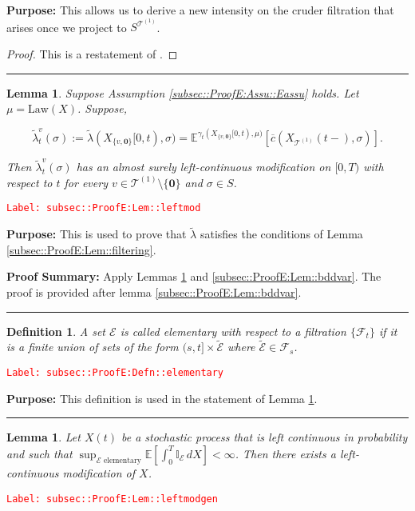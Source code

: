 \documentclass[12pt]{article}
\newcommand{\mb}{\mathbb}
\newcommand{\mc}{\mathcal}
\newcommand{\ov}{\overline}
\newcommand{\te}{\text}
\newcommand{\tr}{\textcolor{red}}
\newcommand{\labe}[1]{\tr{\texttt{Label: #1}}}
\newcommand{\purpose}{\textbf{Purpose: }}
\newcommand{\pfsum}{\textbf{Proof Summary: }}
\newcommand{\lin}{\rule{\linewidth}{0.4 pt}}
\newcommand{\ex}[1]{\mb{E}\left[#1\right]}			%
\newcommand{\exmu}[2]{\mb{E}^{#1}\left[#2\right]}	%
\renewcommand{\root}{\mathbf{0}}				%
\renewcommand{\v}{v}							%
\renewcommand{\S}{S}							%
\newcommand{\s}{\sigma}							%
\newcommand{\T}{T}								%
\renewcommand{\t}{t}							%
\renewcommand{\tt}{s}							%
\newcommand{\F}{\mc{F}}							%
\newcommand{\X}{X}								%
\newcommand{\vind}[1]{^{#1}}					%
\newcommand{\carp}[1]{^{#1}}					%
\newcommand{\cind}[1]{_{#1}}					%
\newcommand{\tp}[1]{(#1)}						%
\newcommand{\tip}[1]{#1}						%
\newcommand{\ts}[1]{_{#1}}						%
\newcommand{\IGrg}{\ov{c}}						%
\newcommand{\tree}{\mc{T}}						%
\newcommand{\sln}[1]{^{(#1)}}					%
\newcommand{\alt}[1]{\widetilde{#1}}			%
\newcommand{\m}{\mu}							%
\newcommand{\cm}{\gamma}						%
\newcommand{\law}{\te{Law}}						%
\newcommand{\evnt}{\mc{E}}						%
\newcommand{\crate}{\alt{\lambda}}				%
\newtheorem{lem}[thms]{Lemma}
\newtheorem{defn}[thms]{Definition}
\begin{document}
\purpose This allows us to derive a new intensity on the cruder filtration that arises once we project to \(\S\carp{\tree\sln{1}}\).

\begin{proof}
This is a restatement of \cite[Theorem 14.3.III]{DalVer08}.
\end{proof}

\lin

\begin{lem}
Suppose Assumption \ref{subsec::ProofE:Assu::Eassu} holds. Let \(\m = \law(\X)\). Suppose,

\[\crate\vind{\v}\ts{\t}(\s) := \crate(\X\cind{\{\v,\root\}}\tip{[0,\t)},\s) = \exmu{\cm\ts{\t}(\X\cind{\{\v,\root\}}\tip{[0,\t)},\m)}{\IGrg(\X\cind{\tree\sln{1}}\tp{\t-},\s)}.\]


Then \(\crate\vind{\v}\ts{\t}(\s)\) has an almost surely left-continuous modification on \([0,\T)\) with respect to \(\t\) for every \(\v \in \tree\sln{1}\setminus\{\root\}\) and \(\s \in \S\).
\label{subsec::ProofE:Lem::leftmod}
\end{lem}
\labe{subsec::ProofE:Lem::leftmod}

\purpose This is used to prove that \(\crate\) satisfies the conditions of Lemma \ref{subsec::ProofE:Lem::filtering}.

\pfsum Apply Lemmas \ref{subsec::ProofE:Lem::leftmodgen} and \ref{subsec::ProofE:Lem::bddvar}. The proof is provided after lemma \ref{subsec::ProofE:Lem::bddvar}.

\lin

\begin{defn}
A set \(\evnt\) is called elementary with respect to a filtration \(\{\F\ts{\t}\}\) if it is a finite union of sets of the form \((\tt,\t]\times \alt{\evnt}\) where \(\alt{\evnt} \in \F\ts{\tt}\).
\label{subsec::ProofE:Defn::elementary}
\end{defn}
\labe{subsec::ProofE:Defn::elementary}

\purpose This definition is used in the statement of Lemma \ref{subsec::ProofE:Lem::leftmodgen}.

\lin

\begin{lem}
Let \(\X\tp{\t}\) be a stochastic process that is left continuous in probability and such that \(\sup_{\evnt\te{ elementary}}\ex{\int_0^\T \mb{I}_\evnt\,d\X} < \infty\). Then there exists a left-continuous modification of \(\X\).
\label{subsec::ProofE:Lem::leftmodgen}
\end{lem}
\labe{subsec::ProofE:Lem::leftmodgen}
\end{document}
